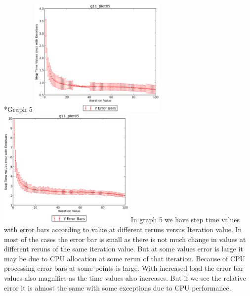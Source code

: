 \documentclass[11pt]{article}
\begin{document}
\begin{subsection}*{Graph 5}
\includegraphics[width=0.5\textwidth,keepaspectratio]{5.eps} \includegraphics[width=0.5\textwidth,keepaspectratio]{load_5.eps}
In graph 5 we have step time values with error bars according to value at different reruns versus Iteration value.
In most of the cases the error bar is small as there is not much change in values at different reruns of the same iteration value. But at some values error is large it may be due to CPU allocation at some  rerun of that iteration. Because of CPU processing error bars at some points is large. 
With increased load the error bar values also magnifies as the time values also increases. But if we see the relative error it is almost the same with some exceptions due to CPU performance.
\end{subsection}
\end{document}
